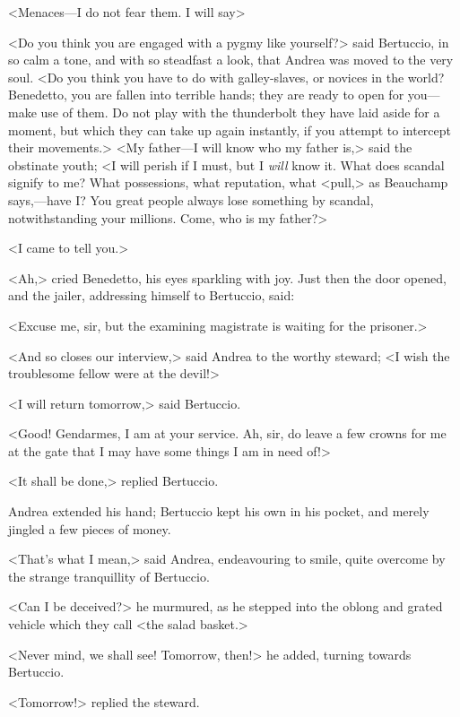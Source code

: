  <Menaces—I do not fear them. I will say\longdash> 

 <Do you think you are engaged with a pygmy like yourself?> said Bertuccio, in so calm a tone, and with so steadfast a look, that Andrea was moved to the very soul. <Do you think you have to do with galley-slaves, or novices in the world? Benedetto, you are fallen into terrible hands; they are ready to open for you—make use of them. Do not play with the thunderbolt they have laid aside for a moment, but which they can take up again instantly, if you attempt to intercept their movements.>  <My father—I will know who my father is,> said the obstinate youth; <I will perish if I must, but I \textit{will} know it. What does scandal signify to me? What possessions, what reputation, what <pull,> as Beauchamp says,—have I? You great people always lose something by scandal, notwithstanding your millions. Come, who is my father?> 

 <I came to tell you.> 

 <Ah,> cried Benedetto, his eyes sparkling with joy. Just then the door opened, and the jailer, addressing himself to Bertuccio, said: 

 <Excuse me, sir, but the examining magistrate is waiting for the prisoner.> 

 <And so closes our interview,> said Andrea to the worthy steward; <I wish the troublesome fellow were at the devil!> 

 <I will return tomorrow,> said Bertuccio. 

 <Good! Gendarmes, I am at your service. Ah, sir, do leave a few crowns for me at the gate that I may have some things I am in need of!> 

 <It shall be done,> replied Bertuccio. 

 Andrea extended his hand; Bertuccio kept his own in his pocket, and merely jingled a few pieces of money. 

 <That's what I mean,> said Andrea, endeavouring to smile, quite overcome by the strange tranquillity of Bertuccio. 

 <Can I be deceived?> he murmured, as he stepped into the oblong and grated vehicle which they call <the salad basket.> 

 <Never mind, we shall see! Tomorrow, then!> he added, turning towards Bertuccio. 

 <Tomorrow!> replied the steward. 